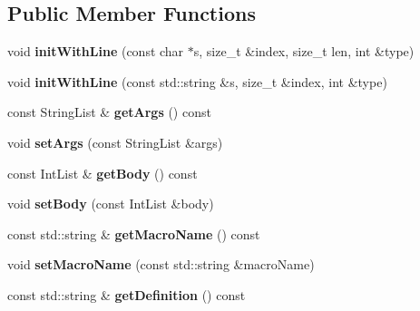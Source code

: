 \subsection*{Public Member Functions}
\begin{DoxyCompactItemize}
\item 
\mbox{\label{classx2_1_1_define_preprocessor_aa4f8b98ee21103a610aa143c1961da25}} 
void {\bfseries init\+With\+Line} (const char $\ast$s, size\+\_\+t \&index, size\+\_\+t len, int \&type)
\item 
\mbox{\label{classx2_1_1_define_preprocessor_af5a3f4ee52922f717c429bc8acdbe67a}} 
void {\bfseries init\+With\+Line} (const std\+::string \&s, size\+\_\+t \&index, int \&type)
\item 
\mbox{\label{classx2_1_1_define_preprocessor_ab4f036cfbf86415e805a57d8cca74d08}} 
const String\+List \& {\bfseries get\+Args} () const
\item 
\mbox{\label{classx2_1_1_define_preprocessor_ab810660a84df5388d90d385607551c65}} 
void {\bfseries set\+Args} (const String\+List \&args)
\item 
\mbox{\label{classx2_1_1_define_preprocessor_a5713a5bfda359572d01d7c648ef1b415}} 
const Int\+List \& {\bfseries get\+Body} () const
\item 
\mbox{\label{classx2_1_1_define_preprocessor_a5c709055e64fbf8bc58c2c7f6d66cd3f}} 
void {\bfseries set\+Body} (const Int\+List \&body)
\item 
\mbox{\label{classx2_1_1_define_preprocessor_a7317a9c6b698bc127d25cd2faabb9958}} 
const std\+::string \& {\bfseries get\+Macro\+Name} () const
\item 
\mbox{\label{classx2_1_1_define_preprocessor_a66415a4f10cbaf15cf1b33b7e4bf6310}} 
void {\bfseries set\+Macro\+Name} (const std\+::string \&macro\+Name)
\item 
\mbox{\label{classx2_1_1_define_preprocessor_a976fcccc95ced64fb7de067f225e3278}} 
const std\+::string \& {\bfseries get\+Definition} () const
\end{DoxyCompactItemize}
